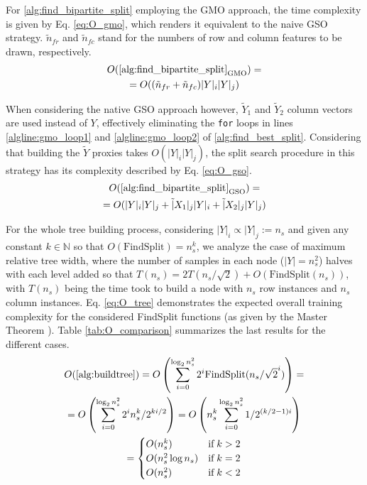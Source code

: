 \documentclass[conference]{IEEEtran}
\begin{document}
For \ref{alg:find_bipartite_split} employing the GMO approach, the time complexity is given by Eq. \ref{eq:O_gmo}, which renders it equivalent to the naive GSO strategy. $\tilde n_{fr}$ and $\tilde n_{fc}$ stand for the numbers of row and column features to be drawn, respectively.
%
\begin{multline}
    O(\ref{alg:find_bipartite_split}_\text{GMO}) =\\
    =O((\tilde n_{fr} + \tilde n_{fc}) |Y|_i|Y|_j)
    \label{eq:O_gmo}
\end{multline}

When considering the native GSO approach however, $\tilde Y_1$ and $\tilde Y_2$ column vectors are used instead of $Y$, effectively eliminating the \texttt{for} loops in lines \ref{algline:gmo_loop1} and \ref{algline:gmo_loop2} of \ref{alg:find_best_split}. Considering that building the $\tilde Y$ proxies takes $O(|Y|_i|Y|_j)$, the split search procedure in this strategy has its complexity described by Eq. \ref{eq:O_gso}.
%
\begin{multline}
    O(\ref{alg:find_bipartite_split}_\text{GSO}) =\\
    = O(|Y|_i|Y|_j + \tilde |X_1|_j|Y|_i + \tilde |X_2|_j|Y|_j)
    \label{eq:O_gso}
\end{multline}

For the whole tree building process, considering $|Y|_i \propto |Y|_j := n_s$ and given any constant $k \in \mathbb{N}$ so that $O(\text{FindSplit})=n_s^k$, we analyze the case of maximum relative tree width, where the number of samples in each node ($|Y| = n_s^2$) halves with each level added so that $T(n_s) = 2T(n_s/\sqrt 2) + O(\text{FindSplit}(n_s))$, with $T(n_s)$ being the time took to build a node with $n_s$ row instances and $n_s$ column instances. Eq. \ref{eq:O_tree} demonstrates the expected overall training complexity for the considered FindSplit functions (as given by the Master Theorem \cite{}). Table \ref{tab:O_comparison} summarizes the last results for the different cases.
%
\begin{multline}
    O(\ref{alg:buildtree})
    = O\left(\sum_{i=0}^{\log_2n_s^2} 2^i \text{FindSplit}(n_s/\sqrt{2}^i)\right)
    =\\
    = O\left(\sum_{i=0}^{\log_2n_s^2} 2^i n_s^k/2^{ki/2}\right)
    = O\left(n_s^k \sum_{i=0}^{\log_2n_s^2} 1 /2^{(k/2-1)i}\right)
    \\
    =
    \begin{cases}
        O(n_s^k) & \text{if}\; k > 2\\
        O(n_s^2\log n_s) & \text{if}\; k = 2\\
        O(n_s^2) & \text{if}\; k < 2\\
    \end{cases}
    \label{eq:O_tree}
\end{multline}
\end{document}
